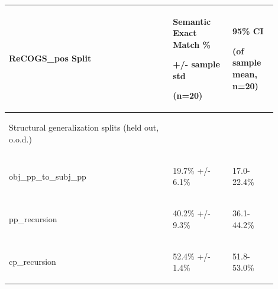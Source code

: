 \documentclass[11pt]{article}
\begin{document}
\begin{table}
{\begin{small}
\end{small}}
\label{results-table}
\end{table}

\begin{table}
\centering
\begin{tabular}{p{0.55\linewidth} p{0.20\linewidth} p{0.15\linewidth}}
\hline
\begin{tiny}\textbf{ReCOGS\_pos Split}\end{tiny} & \begin{tiny}\textbf{Semantic Exact Match \%}

+/- sample std

(n=20)\end{tiny} & \begin{tiny} 95\% CI

(of sample mean, n=20)\end{tiny} \\
\hline
\begin{tiny}Structural generalization splits (held out, o.o.d.)\end{tiny} & \\
\hline
\begin{tiny}obj\_pp\_to\_subj\_pp\end{tiny} & \begin{tiny} 19.7\% +/- 6.1\% \end{tiny} & \begin{tiny}17.0-22.4\%\end{tiny} \\
\begin{tiny}pp\_recursion\end{tiny} & \begin{tiny} 40.2\% +/- 9.3\% \end{tiny} & \begin{tiny}36.1-44.2\%\end{tiny} \\
\begin{tiny}cp\_recursion\end{tiny} & \begin{tiny} 52.4\% +/- 1.4\% \end{tiny} & \begin{tiny}51.8-53.0\%\end{tiny} \\

\end{tabular}
\end{table}
\end{document}
